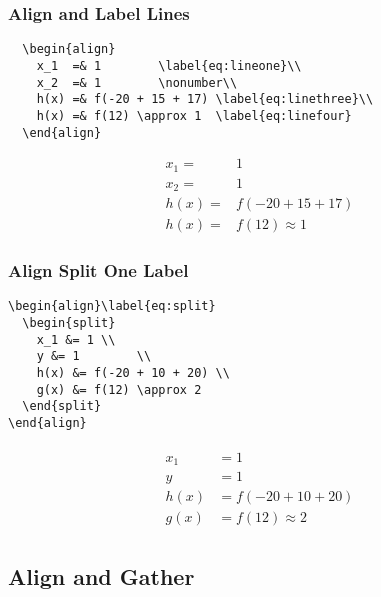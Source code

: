 \documentclass[12pt,english]{article}
\begin{document}
\subsubsection{Align and Label Lines}
\begin{verbatim}
  \begin{align}
    x_1  =& 1        \label{eq:lineone}\\
    x_2  =& 1        \nonumber\\
    h(x) =& f(-20 + 15 + 17) \label{eq:linethree}\\
    h(x) =& f(12) \approx 1  \label{eq:linefour}
  \end{align}
\end{verbatim}
\begin{align}
  x_1  =& 1        \label{eq:lineone}\\
  x_2  =& 1        \nonumber\\
  h(x) =& f(-20 + 15 + 17) \label{eq:linethree}\\
  h(x) =& f(12) \approx 1  \label{eq:linefour}
\end{align}
\subsubsection{Align Split One Label}
\begin{verbatim}
\begin{align}\label{eq:split}
  \begin{split}
    x_1 &= 1 \\
    y &= 1        \\
    h(x) &= f(-20 + 10 + 20) \\
    g(x) &= f(12) \approx 2
  \end{split}
\end{align}
\end{verbatim}
\begin{align}\label{eq:split}
  \begin{split}
    x_1 &= 1 \\
    y &= 1        \\
    h(x) &= f(-20 + 10 + 20) \\
    g(x) &= f(12) \approx 2
  \end{split}
\end{align}

\pagebreak
\subsection{Align and Gather}
\end{document}
